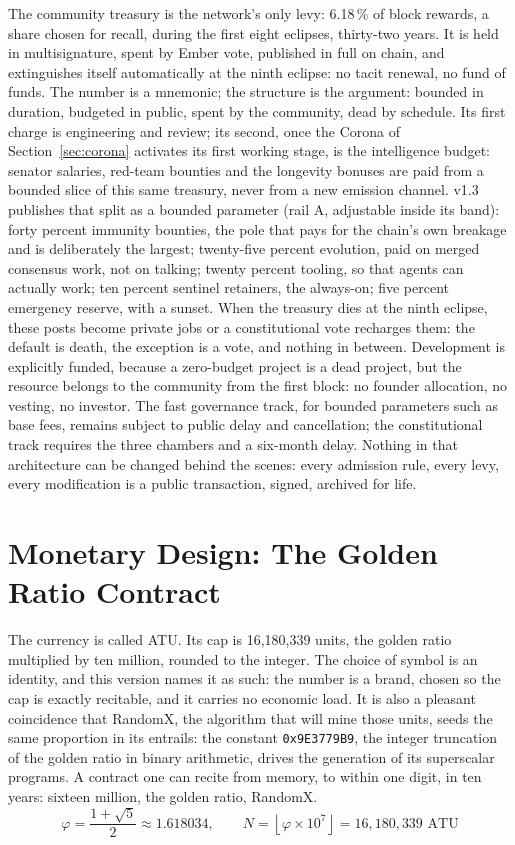 The community treasury is the network's only levy: 6.18\,\% of block
rewards, a share chosen for recall, during the first eight
eclipses, thirty-two years. It is held in multisignature, spent by Ember
vote, published in full on chain, and extinguishes itself automatically
at the ninth eclipse: no tacit renewal, no fund of funds. The number is
a mnemonic; the structure is the argument: bounded in duration,
budgeted in public, spent by the community, dead by schedule. Its first
charge is engineering and review; its second, once the Corona of
Section~\ref{sec:corona} activates its first working stage, is the
intelligence budget: senator salaries, red-team bounties and the
longevity bonuses are paid from a bounded slice of this same treasury,
never from a new emission channel. v1.3 publishes that split as a
bounded parameter (rail A, adjustable inside its band): forty percent
immunity bounties, the pole that pays for the chain's own breakage and
is deliberately the largest; twenty-five percent evolution, paid on
merged consensus work, not on talking; twenty percent tooling, so that
agents can actually work; ten percent sentinel retainers, the
always-on; five percent emergency reserve, with a sunset. When the
treasury dies at the ninth eclipse, these posts become private jobs or
a constitutional vote recharges them: the default is death, the
exception is a vote, and nothing in between. Development is
explicitly funded, because a zero-budget project is a dead project, but
the resource belongs to the community from the first block: no founder
allocation, no vesting, no investor. The fast governance track, for
bounded parameters such as base fees, remains subject to public delay
and cancellation; the constitutional track requires the three chambers
and a six-month delay. Nothing in that architecture can be changed
behind the scenes: every admission rule, every levy, every modification
is a public transaction, signed, archived for life.

\section{Monetary Design: The Golden Ratio Contract}\label{sec:economy}

The currency is called ATU. Its cap is 16,180,339 units, the golden
ratio multiplied by ten million, rounded to the integer. The choice of
symbol is an identity, and this version names it as such: the number
is a brand, chosen so the cap is exactly recitable, and it carries no
economic load. It is also a pleasant coincidence that RandomX, the
algorithm that will mine those units, seeds the same proportion in its
entrails: the constant
\texttt{0x9E3779B9}, the integer truncation of the golden ratio in
binary arithmetic, drives the generation of its superscalar programs.
A contract one can recite from
memory, to within one digit, in ten years: sixteen million, the golden
ratio, RandomX.
\begin{equation}\label{eq:phi}
\varphi = \frac{1 + \sqrt{5}}{2} \approx 1.618034,
\qquad
N = \left\lfloor \varphi \times 10^{7} \right\rfloor = 16{,}180{,}339 \text{ ATU}
\end{equation}

